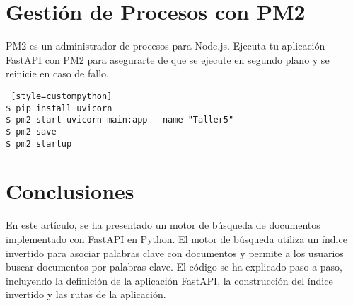 \documentclass[journal]{IEEEtran}
\begin{document}
\section{Gestión de Procesos con PM2}
PM2 es un administrador de procesos para Node.js. Ejecuta tu aplicación FastAPI con PM2 para asegurarte de que se ejecute en segundo plano y se reinicie en caso de fallo.

\begin{lstlisting} [style=custompython]
$ pip install uvicorn
$ pm2 start uvicorn main:app --name "Taller5"
$ pm2 save
$ pm2 startup
\end{lstlisting}

\section{Conclusiones}
En este artículo, se ha presentado un motor de búsqueda de documentos implementado con FastAPI en Python. El motor de búsqueda utiliza un índice invertido para asociar palabras clave con documentos y permite a los usuarios buscar documentos por palabras clave. El código se ha explicado paso a paso, incluyendo la definición de la aplicación FastAPI, la construcción del índice invertido y las rutas de la aplicación.
\end{document}
